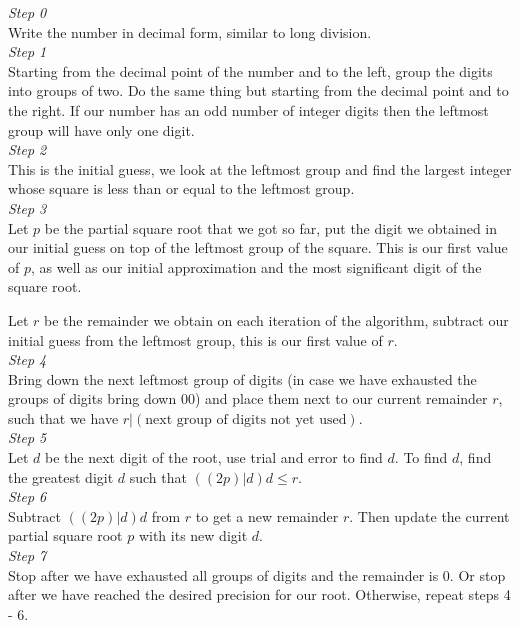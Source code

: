 \documentclass{uofa_template}
\begin{document}
\begin{enumerate}
\emph{Step 0} \\
Write the number in decimal form, similar to long division. \\

\emph{Step 1} \\
Starting from the decimal point of the number and to the left, group the digits into groups of two. Do the same thing but starting from the decimal point and to the right. If our number has an odd number of integer digits then the leftmost group will have only one digit. \\

\emph{Step 2} \\
This is the initial guess, we look at the leftmost group and find the largest integer whose square is less than or equal to the leftmost group. \\

\emph{Step 3} \\
Let $p$ be the partial square root that we got so far, put the digit we obtained in our initial guess on top of the leftmost group of the square. This is our first value of $p$, as well as our initial approximation and the most significant digit of the square root.

Let $r$ be the remainder we obtain on each iteration of the algorithm, subtract our initial guess from the leftmost group, this is our first value of $r$. \\

\emph{Step 4} \\
Bring down the next leftmost group of digits (in case we have exhausted the groups of digits bring down $00$) and place them next to our current remainder $r$, such that we have $r|(\text{next group of digits not yet used})$. \\

\emph{Step 5} \\
Let $d$ be the next digit of the root, use trial and error to find $d$. To find $d$, find the greatest digit $d$ such that $((2p)|d)d \leq r$. \\

\emph{Step 6} \\
Subtract $((2p)|d)d$ from $r$ to get a new remainder $r$. Then update the current partial square root $p$ with its new digit $d$. \\

\emph{Step 7} \\
Stop after we have exhausted all groups of digits and the remainder is $0$. Or stop after we have reached the desired precision for our root. Otherwise, repeat steps 4 - 6. \\


\end{enumerate}
\end{document}
